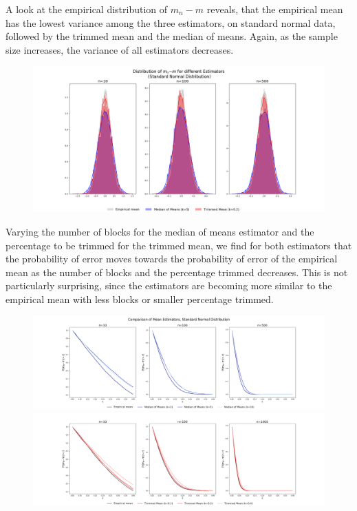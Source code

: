 \documentclass[a4paper, 11pt]{article} %
\begin{document}
A look at the empirical distribution of $m_n - m$ reveals, that the empirical mean has the lowest variance among the three estimators, on standard normal data, followed by the trimmed mean and the median of means. Again, as the sample size increases, the variance of all estimators decreases. 

\begin{figure}[H]
\centering
\includegraphics[scale=0.3]{Gaussian_Distribution_k5} 
\end{figure}

\noindent Varying the number of blocks for the median of means estimator and the percentage to be trimmed for the trimmed mean, we find for both estimators that the probability of error moves towards the probability of error of the empirical mean as the number of blocks and the percentage trimmed decreases. This is not particularly surprising, since the estimators are becoming more similar to the empirical mean with less blocks or smaller percentage trimmed.

\begin{figure}[H]
\centering
\includegraphics[scale=0.25]{Gaussian_MoM}
\includegraphics[scale=0.25]{Gaussian_TrM}
\end{figure}
\end{document}
